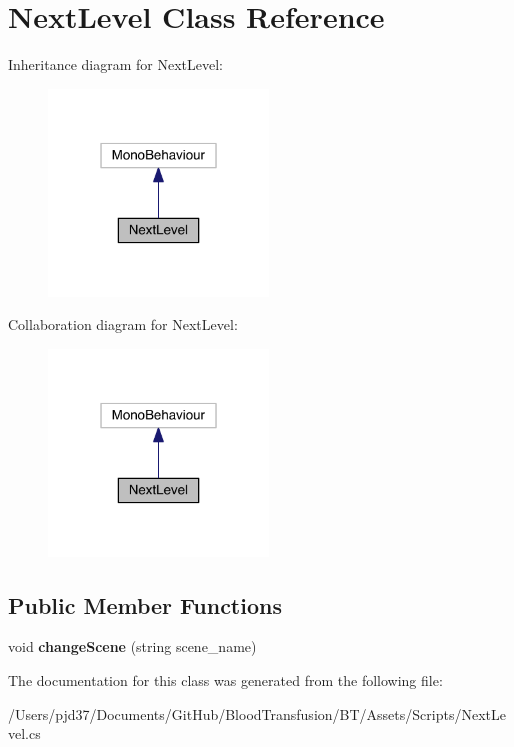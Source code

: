 \hypertarget{class_next_level}{}\section{Next\+Level Class Reference}
\label{class_next_level}


Inheritance diagram for Next\+Level\+:\nopagebreak
\begin{figure}[H]
\begin{center}
\leavevmode
\includegraphics[width=166pt]{class_next_level__inherit__graph}
\end{center}
\end{figure}


Collaboration diagram for Next\+Level\+:\nopagebreak
\begin{figure}[H]
\begin{center}
\leavevmode
\includegraphics[width=166pt]{class_next_level__coll__graph}
\end{center}
\end{figure}
\subsection*{Public Member Functions}
\begin{DoxyCompactItemize}
\item 
void {\bfseries change\+Scene} (string scene\+\_\+name)\hypertarget{class_next_level_a3ef70bb752715e942f354d64610693f4}{}\label{class_next_level_a3ef70bb752715e942f354d64610693f4}

\end{DoxyCompactItemize}


The documentation for this class was generated from the following file\+:\begin{DoxyCompactItemize}
\item 
/\+Users/pjd37/\+Documents/\+Git\+Hub/\+Blood\+Transfusion/\+B\+T/\+Assets/\+Scripts/Next\+Level.\+cs\end{DoxyCompactItemize}
